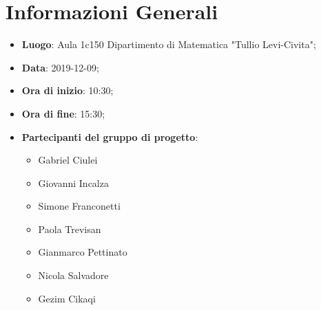 \section{Informazioni Generali}
	\begin{itemize}
		\item \textbf {Luogo}: Aula 1c150 Dipartimento di Matematica "Tullio Levi-Civita";
		\item \textbf {Data}: 2019-12-09;
		\item \textbf {Ora di inizio}: 10:30;
		\item \textbf {Ora di fine}: 15:30;
		\item \textbf {Partecipanti del gruppo di progetto}:
			\begin{itemize}
				\item Gabriel Ciulei
				\item Giovanni Incalza
				\item Simone Franconetti
				\item Paola Trevisan
				\item Gianmarco Pettinato
				\item Nicola Salvadore
				\item Gezim Cikaqi
			\end{itemize}
	\end{itemize}
